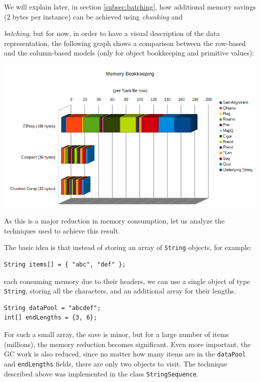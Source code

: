 \documentclass[a4paper,twoside]{article}
\begin{document}
We will explain later, in section \ref{subsec:batching}, how additional memory savings ($2$ bytes per instance) can be achieved using \textit{chunking} and {\textit{batching}, but for now, in order to have a visual description of the data representation, the following graph shows a comparison between the row-based and the column-based models (only for object bookkeeping and primitive values):

\begin{center}
	\includegraphics[scale=0.35]{images/MemoryBookeeping.png}
\end{center}

As this is a major reduction in memory consumption, let us analyze the techniques used to achieve this result.

The basic idea is that instead of storing an array of {\texttt{String}} objects, for example:
\begin{verbatim}
String items[] = { "abc", "def" };
\end{verbatim}
each consuming memory due to their headers, we can use 
a single object of type {\texttt{String}}, storing all the characters, and an additional array for their lengths.
\begin{verbatim}
String dataPool = "abcdef";
int[] endLengths = {3, 6};
\end{verbatim}

For such a small array, the save is minor, but for a large number of items (millions), the memory reduction becomes significant.
Even more important, the GC work is also reduced, since no matter how many items are in the {\texttt{dataPool}} and {\texttt{endLengths}} fields, there are only two objects to visit.
The technique described above was implemented in the class {\texttt{StringSequence}}.

}
\end{document}
